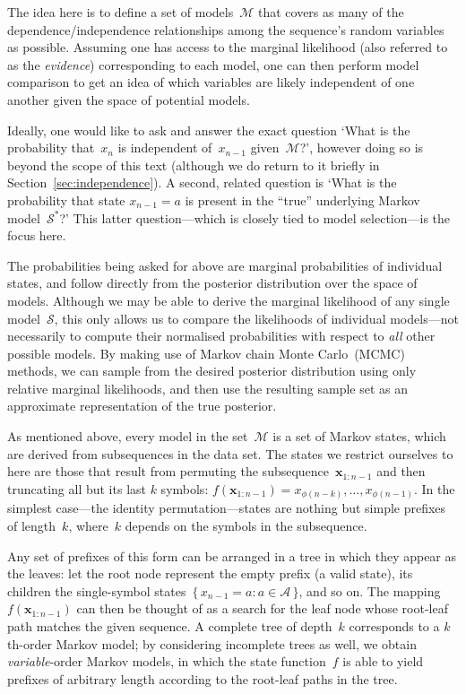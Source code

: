 \documentclass[11pt,a4paper]{article}
\newcommand\mc[1]{\mathcal{#1}}               %
\newcommand\ub[1]{\symbf{#1}}                 %
\begin{document}
The idea here is to define a set of models~\(\mc{M}\) that covers as many of the
dependence/independence relationships among the sequence's random variables as
possible. Assuming one has access to the marginal likelihood (also referred to
as the \emph{evidence}) corresponding to each model, one can then perform model
comparison to get an idea of which variables are likely independent of one
another given the space of potential models.

Ideally, one would like to ask and answer the exact question `What is the
probability that~\(x_n\) is independent of~\(x_{n-1}\) given~\(\mc{M}\)?',
however doing so is beyond the scope of this text (although we do return to it
briefly in Section~\ref{sec:independence}). A second, related question is `What
is the probability that state \({x_{n-1} = a}\) is present in the ``true''
underlying Markov model~\(\mc{S}^*\)?' This latter question---which is closely
tied to model selection---is the focus here.

The probabilities being asked for above are marginal probabilities of individual
states, and follow directly from the posterior distribution over the space of
models. Although we may be able to derive the marginal likelihood of any single
model~\(\mc{S}\), this only allows us to compare the likelihoods of individual
models---not necessarily to compute their normalised probabilities with respect
to \emph{all} other possible models. By making use of Markov chain Monte
Carlo~(MCMC) methods, we can sample from the desired posterior distribution
using only relative marginal likelihoods, and then use the resulting sample set
as an approximate representation of the true posterior.

As mentioned above, every model in the set~\(\mc{M}\) is a set of Markov states,
which are derived from subsequences in the data set. The states we restrict
ourselves to here are those that result from permuting the
subsequence~\(\ub{x}_{1:n-1}\) and then truncating all but its last \(k\)
symbols: \(f(\ub{x}_{1:n-1}) = x_{\phi(n-k)}, \dots, x_{\phi(n-1)}\). In the
simplest case---the identity permutation---states are nothing but simple
prefixes of length~\(k\), where~\(k\) depends on the symbols in the subsequence.

Any set of prefixes of this form can be arranged in a tree in which they appear
as the leaves: let the root node represent the empty prefix (a valid state), its
children the single-symbol states~\({\{\,x_{n-1} = a : a \in \mc{A}\,\}}\), and
so on. The mapping~\(f(\ub{x}_{1:n-1})\) can then be thought of as a search for
the leaf node whose root-leaf path matches the given sequence. A complete tree
of depth~\(k\) corresponds to a \(k\)th-order Markov model; by considering
incomplete trees as well, we obtain \emph{variable}-order Markov models, in
which the state function~\(f\) is able to yield prefixes of arbitrary length
according to the root-leaf paths in the tree.
\end{document}
